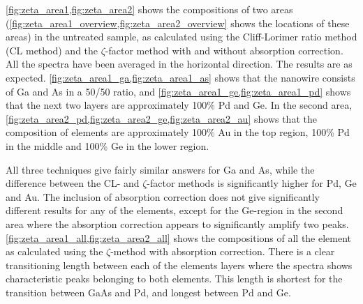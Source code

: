\cref{fig:zeta_area1,fig:zeta_area2} shows the compositions of two areas (\cref{fig:zeta_area1_overview,fig:zeta_area2_overview} shows the locations of these areas) in the untreated sample, as calculated using the Cliff-Lorimer ratio method (CL method) and the $\zeta$-factor method with and without absorption correction. All the spectra have been averaged in the horizontal direction. The results are as expected. \cref{fig:zeta_area1_ga,fig:zeta_area1_as} shows that the nanowire consists of Ga and As in a 50/50 ratio, and \cref{fig:zeta_area1_ge,fig:zeta_area1_pd} shows that the next two layers are approximately 100\% Pd and Ge. In the second area, \cref{fig:zeta_area2_pd,fig:zeta_area2_ge,fig:zeta_area2_au} shows that the composition of elements are approximately 100\% Au in the top region, 100\% Pd in the middle and 100\% Ge in the lower region.

All three techniques give fairly similar answers for Ga and As, while the difference between the CL- and $\zeta$-factor methods is significantly higher for Pd, Ge and Au. The inclusion of absorption correction does not give significantly different results for any of the elements, except for the Ge-region in the second area where the absorption correction appears to significantly amplify two peaks. \cref{fig:zeta_area1_all,fig:zeta_area2_all} shows the compositions of all the element as calculated using the $\zeta$-method with absorption correction. There is a clear transitioning length between each of the elements layers where the spectra shows characteristic peaks belonging to both elements. This length is shortest for the transition between GaAs and Pd, and longest between Pd and Ge.

